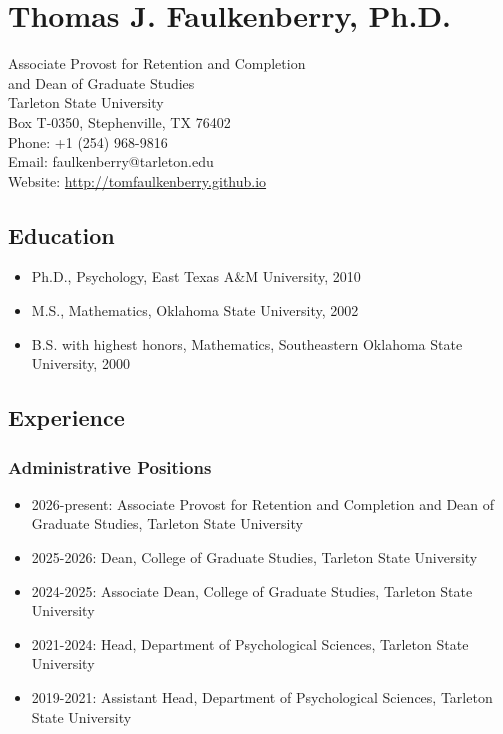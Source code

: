 \documentclass[article,10pt]{article}
\date{\today}
\title{}
\begin{document}
\section*{Thomas J. Faulkenberry, Ph.D.}
\label{sec:org8d31197}

Associate Provost for Retention and Completion \\
and Dean of Graduate Studies\\
Tarleton State University\\
Box T-0350, Stephenville, TX 76402\\
Phone: +1 (254) 968-9816\\
Email: faulkenberry@tarleton.edu\\
Website: \url{http://tomfaulkenberry.github.io}
\subsection*{Education}
\label{sec:orga55fc7e}
\begin{itemize}
\item Ph.D., Psychology, East Texas A\&M University, 2010
\item M.S., Mathematics, Oklahoma State University, 2002
\item B.S. with highest honors, Mathematics, Southeastern Oklahoma State University, 2000
\end{itemize}
\subsection*{Experience}
\label{sec:orga2ed134}
\subsubsection*{Administrative Positions}
\label{sec:org340dc99}
\begin{itemize}
\item 2026-present: Associate Provost for Retention and Completion and Dean of Graduate Studies, Tarleton State University
\item 2025-2026: Dean, College of Graduate Studies, Tarleton State University
\item 2024-2025: Associate Dean, College of Graduate Studies, Tarleton State University
\item 2021-2024: Head, Department of Psychological Sciences, Tarleton State University
\item 2019-2021: Assistant Head, Department of Psychological Sciences, Tarleton State University
\end{itemize}
\end{document}
